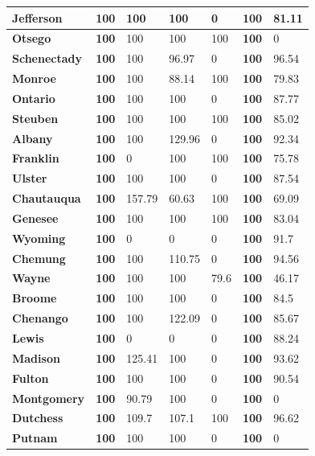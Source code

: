 \documentclass[10pt,twocolumn,letterpaper]{article}
\begin{document}
\begin{table}[htb!]
\begin{center}
\begin{tabular}{|l|l|l|l|l|l|l|}
\textbf{Jefferson} & \textbf{100} & 100 & 100 & 0 & \textbf{100} & 81.11 \\ \hline
\textbf{Otsego} & \textbf{100} & 100 & 100 & 100 & \textbf{100} & 0 \\ \hline
\textbf{Schenectady} & \textbf{100} & 100 & 96.97 & 0 & \textbf{100} & 96.54 \\ \hline
\textbf{Monroe} & \textbf{100} & 100 & 88.14 & 100 & \textbf{100} & 79.83 \\ \hline
\textbf{Ontario} & \textbf{100} & 100 & 100 & 0 & \textbf{100} & 87.77 \\ \hline
\textbf{Steuben} & \textbf{100} & 100 & 100 & 100 & \textbf{100} & 85.02 \\ \hline
\textbf{Albany} & \textbf{100} & 100 & 129.96 & 0 & \textbf{100} & 92.34 \\ \hline
\textbf{Franklin} & \textbf{100} & 0 & 100 & 100 & \textbf{100} & 75.78 \\ \hline
\textbf{Ulster} & \textbf{100} & 100 & 100 & 0 & \textbf{100} & 87.54 \\ \hline
\textbf{Chautauqua} & \textbf{100} & 157.79 & 60.63 & 100 & \textbf{100} & 69.09 \\ \hline
\textbf{Genesee} & \textbf{100} & 100 & 100 & 100 & \textbf{100} & 83.04 \\ \hline
\textbf{Wyoming} & \textbf{100} & 0 & 0 & 0 & \textbf{100} & 91.7 \\ \hline
\textbf{Chemung} & \textbf{100} & 100 & 110.75 & 0 & \textbf{100} & 94.56 \\ \hline
\textbf{Wayne} & \textbf{100} & 100 & 100 & 79.6 & \textbf{100} & 46.17 \\ \hline
\textbf{Broome} & \textbf{100} & 100 & 100 & 0 & \textbf{100} & 84.5 \\ \hline
\textbf{Chenango} & \textbf{100} & 100 & 122.09 & 0 & \textbf{100} & 85.67 \\ \hline
\textbf{Lewis} & \textbf{100} & 0 & 0 & 0 & \textbf{100} & 88.24 \\ \hline
\textbf{Madison} & \textbf{100} & 125.41 & 100 & 0 & \textbf{100} & 93.62 \\ \hline
\textbf{Fulton} & \textbf{100} & 100 & 100 & 0 & \textbf{100} & 90.54 \\ \hline
\textbf{Montgomery} & \textbf{100} & 90.79 & 100 & 0 & \textbf{100} & 0 \\ \hline
\textbf{Dutchess} & \textbf{100} & 109.7 & 107.1 & 100 & \textbf{100} & 96.62 \\ \hline
\textbf{Putnam} & \textbf{100} & 100 & 100 & 0 & \textbf{100} & 0 \\ \hline

\end{tabular}
\end{center}
\end{table}
\end{document}
